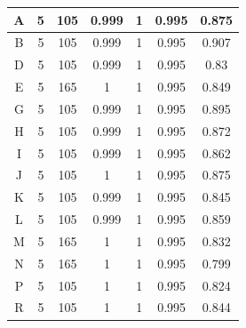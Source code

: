 \begin{center}
\begin{longtable}[c]{|c|c|c|c|c|c|c|}
    A              & 5                          & 105                   & 0.999      & 1          & 0.995            & 0.875                 \\ \hline
    B              & 5                          & 105                   & 0.999      & 1          & 0.995            & 0.907                 \\ \hline
    D              & 5                          & 105                   & 0.999      & 1          & 0.995            & 0.83                  \\ \hline
    E              & 5                          & 165                   & 1          & 1          & 0.995            & 0.849                 \\ \hline
    G              & 5                          & 105                   & 0.999      & 1          & 0.995            & 0.895                 \\ \hline
    H              & 5                          & 105                   & 0.999      & 1          & 0.995            & 0.872                 \\ \hline
    I              & 5                          & 105                   & 0.999      & 1          & 0.995            & 0.862                 \\ \hline
    J              & 5                          & 105                   & 1          & 1          & 0.995            & 0.875                 \\ \hline
    K              & 5                          & 105                   & 0.999      & 1          & 0.995            & 0.845                 \\ \hline
    L              & 5                          & 105                   & 0.999      & 1          & 0.995            & 0.859                 \\ \hline
    M              & 5                          & 165                   & 1          & 1          & 0.995            & 0.832                 \\ \hline
    N              & 5                          & 165                   & 1          & 1          & 0.995            & 0.799                 \\ \hline
    P              & 5                          & 105                   & 1          & 1          & 0.995            & 0.824                 \\ \hline
    R              & 5                          & 105                   & 1          & 1          & 0.995            & 0.844                 \\ \hline

\end{longtable}
\end{center}
